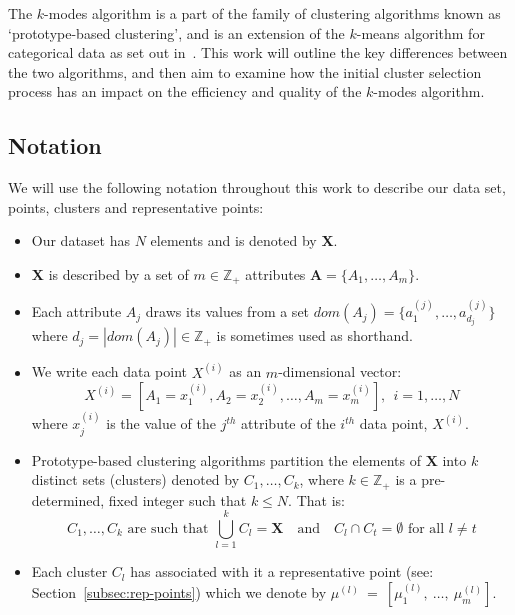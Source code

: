 The \(k\)-modes algorithm is a part of the family of clustering algorithms known 
as `prototype-based clustering', and is an extension of the \(k\)-means 
algorithm for categorical data as set out in~\cite{Huang98}. This work will 
outline the key differences between the two algorithms, and then aim to 
examine how the initial cluster selection process has an impact on the 
efficiency and quality of the \(k\)-modes algorithm.\\


\subsection{Notation}\label{subsec:notation}

We will use the following notation throughout this work to describe our data 
set, points, clusters and representative points:

\begin{itemize}
    \item Our dataset has \(N\) elements and is denoted by \textbf{X}.
    \item \textbf{X} is described by a set of \(m \in \mathbb{Z}_+\) attributes 
        \(\textbf{A} = \{A_1, \ldots, A_m\}\).
    \item Each attribute \(A_j\) draws its values from a set \(dom(A_j) = 
        \{a_1^{(j)}, \ldots, a_{d_j}^{(j)}\}\) where \(d_j = |dom(A_j)| \in 
        \mathbb{Z}_+\) is sometimes used as shorthand.
    \item We write each data point \(X^{(i)}\) as an \(m\)-dimensional vector:
	\[
		X^{(i)} = \left[A_1 = x_1^{(i)}, A_2 = x_2^{(i)}, \ldots, A_m = 
        x_m^{(i)}\right], \ \ i=1, \ldots, N
	\]
        where \(x_j^{(i)}\) is the value of the \(j^{th}\) attribute of the
        \(i^{th}\) data point, \(X^{(i)}\).
	\item Prototype-based clustering algorithms partition the elements of 
        \(\textbf{X}\) into \(k\) distinct sets (clusters) denoted by \(C_1, 
        \ldots, C_k\), where \(k \in \mathbb{Z}_+\) is a pre-determined, fixed 
        integer such that \(k \le N\). That is:
	\[
		C_1, \ldots, C_k \text{ are such that } \bigcup_{l=1}^k C_l = 
		\textbf{X} \quad \text{and} \quad C_l \cap C_t = \emptyset 
		\text{ for all } l \ne t
	\]
    \item Each cluster \(C_l\) has associated with it a representative point 
		(see: Section~\ref{subsec:rep-points}) which we denote by 
        \(\mu^{(l)}~=~\left[\mu_1^{(l)},~\ldots,~\mu_m^{(l)}\right]\).
\end{itemize}


